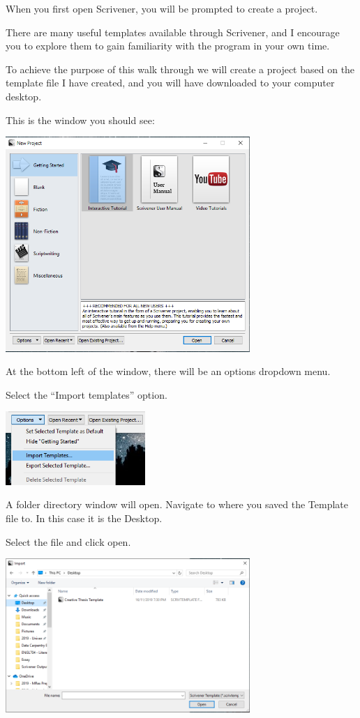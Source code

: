 \documentclass{article}
\begin{document}
When you first open Scrivener, you will be prompted to create a project. 

There are many useful templates available through Scrivener, and I encourage you to explore them to gain familiarity with the program in your own time. 

To achieve the purpose of this walk through we will create a project based on the template file I have created, and you will have downloaded to your computer desktop.

This is the window you should see:

\includegraphics[width=350px]{images/scriv001.PNG}

At the bottom left of the window, there will be an options dropdown menu. 

Select the ``Import templates'' option.

\includegraphics[width=200px]{images/scriv002.PNG}

A folder directory window will open. Navigate to where you saved the Template file to. In this case it is the Desktop.

Select the file and click open.

\includegraphics[width=350px]{images/scriv003.PNG}
\end{document}
